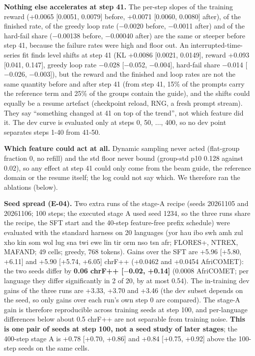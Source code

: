\textbf{Nothing else accelerates at step 41.} The per-step slopes of the training reward (+0.0065 [0.0051, 0.0079] before, +0.0071 [0.0060, 0.0080] after), of the finished rate, of the greedy loop rate (\ensuremath{-}0.0020 before, \ensuremath{-}0.0011 after) and of the hard-fail share (\ensuremath{-}0.00138 before, \ensuremath{-}0.00040 after) are the same or steeper before step 41, because the failure rates were high and floor out. An interrupted-time-series fit finds level shifts at step 41 (KL +0.0086 [0.0021, 0.0149], reward +0.093 [0.041, 0.147], greedy loop rate \ensuremath{-}0.028 [\ensuremath{-}0.052, \ensuremath{-}0.004], hard-fail share \ensuremath{-}0.014 [\ensuremath{-}0.026, \ensuremath{-}0.003]), but the reward and the finished and loop rates are not the same quantity before and after step 41 (from step 41, 15\% of the prompts carry the reference term and 25\% of the groups contain the guide), and the shifts could equally be a resume artefact (checkpoint reload, RNG, a fresh prompt stream). They say ``something changed at 41 on top of the trend'', not which feature did it. The dev curve is evaluated only at steps 0, 50, ..., 400, so no dev point separates steps 1-40 from 41-50. 

\textbf{Which feature could act at all.} Dynamic sampling never acted (flat-group fraction 0, no refill) and the std floor never bound (group-std p10 0.128 against 0.02), so any effect at step 41 could only come from the beam guide, the reference domain or the resume itself; the log could not say which. We therefore ran the ablations (below).

\textbf{Seed spread (E-04).} Two extra runs of the stage-A recipe (seeds 20261105 and 20261106; 100 steps; the executed stage A used seed 1234, so the three runs share the recipe, the SFT start and the 40-step feature-free prefix schedule) were evaluated with the standard harness on 20 languages (yor hau ibo swh amh zul xho kin som wol lug sna twi ewe lin tir orm nso tsn afr; FLORES+, NTREX, MAFAND; 49 cells; greedy, 768 tokens). Gains over the SFT are +5.96 [+5.80, +6.11] and +5.90 [+5.74, +6.05] chrF++ (+0.0462 and +0.0454 AfriCOMET): the two seeds differ by \textbf{0.06 chrF++ [\ensuremath{-}0.02, +0.14]} (0.0008 AfriCOMET; per language they differ significantly in 2 of 20, by at most 0.54). The in-training dev gains of the three runs are +3.33, +3.70 and +3.46 (the dev subset depends on the seed, so only gains over each run's own step 0 are compared). The stage-A gain is therefore reproducible across training seeds at step 100, and per-language differences below about 0.5 chrF++ are not separable from training noise. \textbf{This is one pair of seeds at step 100, not a seed study of later stages}; the 400-step stage A is +0.78 [+0.70, +0.86] and +0.84 [+0.75, +0.92] above the 100-step seeds on the same cells. 

